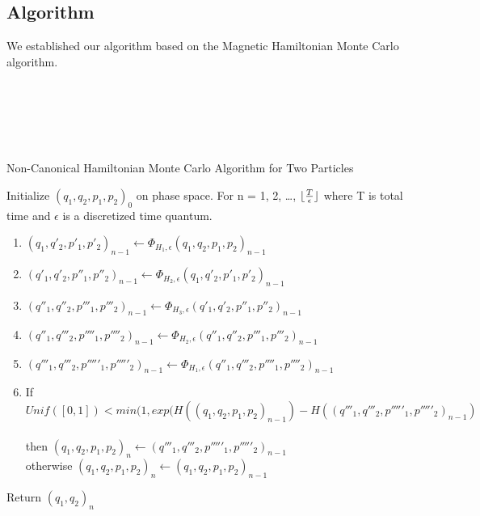 \documentclass{article}
\begin{document}
\subsection{Algorithm}
\newcommand\rownumber{\stepcounter{rownumbers}\arabic{rownumbers}}
\DeclarePairedDelimiter\floor{\lfloor}{\rfloor}
We established our algorithm based on the Magnetic Hamiltonian Monte Carlo algorithm.
\\
\\
\\
\\
\\
\\
\begin{algorithm}
\caption{Non-Canonical Hamiltonian Monte Carlo Algorithm for Two Particles}
\begin{algorithmic}
\STATE\begin{enumerate}
  \STATE Initialize $(q_1, q_2, p_1, p_2)_0$ on phase space.
  \STATE For n = 1, 2, \ldots, $\floor{\frac{T}{\epsilon}}$ where T is total time and $\epsilon$ is a discretized time quantum. 
  \begin{enumerate}
\item $(q_1, q'_2, p'_1, p'_2)_{n-1} \leftarrow \Phi_{H_1,\epsilon}(q_1, q_2, p_1, p_2)_{n-1}$
\item $(q'_1, q'_2, p''_1, p''_2)_{n-1} \leftarrow \Phi_{H_2,\epsilon}(q_1, q'_2, p'_1, p'_2)_{n-1}$
\item $(q''_1, q''_2, p'''_1, p'''_2)_{n-1} \leftarrow \Phi_{H_3,\epsilon}(q'_1, q'_2, p''_1, p''_2)_{n-1}$
\item $(q''_1, q'''_2, p''''_1, p''''_2)_{n-1} \leftarrow \Phi_{H_2,\epsilon}(q''_1, q''_2, p'''_1, p'''_2)_{n-1}$
\item $(q'''_1, q'''_2, p'''''_1, p'''''_2)_{n-1} \leftarrow \Phi_{H_1,\epsilon}(q''_1, q'''_2, p''''_1, p''''_2)_{n-1}$
\item If $$ Unif([0, 1])<min(1,exp(H((q_1, q_2, p_1, p_2)_{n-1})
-H((q'''_1, q'''_2, p'''''_1, p'''''_2)_{n-1})$$ \\
then $(q_1, q_2, p_1, p_2)_{n} \leftarrow (q'''_1, q'''_2, p'''''_1, p'''''_2)_{n-1}$ \\
otherwise $(q_1, q_2, p_1, p_2)_{n} \leftarrow (q_1, q_2, p_1, p_2)_{n-1}$
\end{enumerate}
\STATE Return $(q_1, q_2)_{n}$ 
\end{enumerate}

\end{algorithmic}
\end{algorithm}
\end{document}
